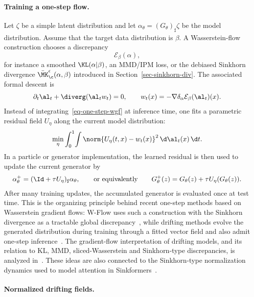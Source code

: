 \paragraph{Training a one-step flow.}

Let $\zeta$ be a simple latent distribution and let $\alpha_\theta=(G_\theta)_\sharp\zeta$ be the model distribution. Assume that the target data distribution is $\beta$. A Wasserstein-flow construction chooses a discrepancy
\[
	\mathcal E_\beta(\alpha),
\]
for instance a smoothed $\KL(\alpha|\beta)$, an MMD/IPM loss, or the debiased Sinkhorn divergence $\bar\MK_\c^\epsilon(\alpha,\beta)$ introduced in Section~\ref{sec-sinkhorn-div}. The associated formal descent is
\begin{equation}\label{eq-one-step-wgf}
	\partial_t\al_t+\diverg(\al_t w_t)=0,
	\qquad
	w_t(x)=-\nabla\delta_\alpha \mathcal E_\beta(\al_t)(x).
\end{equation}
Instead of integrating~\eqref{eq-one-step-wgf} at inference time, one fits a parametric residual field $U_\eta$ along the current model distribution:
\begin{equation}\label{eq-one-step-l2-fit}
	\min_\eta \int_0^1\!\int
		\norm{U_\eta(t,x)-w_t(x)}^2
		\,\d\al_t(x)\,\d t.
\end{equation}
In a particle or generator implementation, the learned residual is then used to update the current generator by
\[
	\alpha_{\theta}^{+}
	=
	(\Id+\tau U_\eta)_\sharp \alpha_\theta,
	\qquad\text{or equivalently}\qquad
	G_\theta^{+}(z)=G_\theta(z)+\tau U_\eta(G_\theta(z)).
\]
After many training updates, the accumulated generator is evaluated once at test time. This is the organizing principle behind recent one-step methods based on Wasserstein gradient flows: W-Flow uses such a construction with the Sinkhorn divergence as a tractable global discrepancy~\cite{Han2026WFlow}, while drifting methods evolve the generated distribution during training through a fitted vector field and also admit one-step inference~\cite{Deng2026Drifting}. The gradient-flow interpretation of drifting models, and its relation to KL, MMD, sliced-Wasserstein and Sinkhorn-type discrepancies, is analyzed in~\cite{Gretton2026DriftingWGF,He2026SinkhornDrifting}. These ideas are also connected to the Sinkhorn-type normalization dynamics used to model attention in Sinkformers~\cite{Sander2022Sinkformers}.

\paragraph{Normalized drifting fields.}

